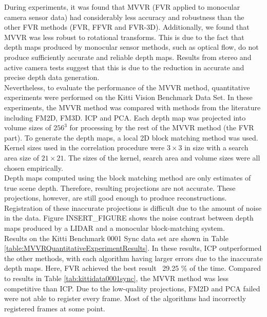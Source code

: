 
During experiments, it was found that MVVR (FVR applied to monocular camera sensor data) had considerably less accuracy and robustness than the other FVR methods (FVR, FFVR and FVR-3D). Additionally, we found that MVVR was less robust to rotational transforms. This is due to the fact that depth maps produced by monocular sensor methods, such as optical flow, do not produce sufficiently accurate and reliable depth maps. Results from stereo and active camera tests suggest that this is due to the reduction in accurate and precise depth data generation. \\

Nevertheless, to evaluate the performance of the MVVR method, quantitative experiments were performed on the Kitti Vision Benchmark Data Set. In these experiments, the MVVR method was compared with methods from the literature including FM2D, FM3D. ICP and PCA. Each depth map was projected into volume sizes of $256^3$ for processing by the rest of the MVVR method (the FVR part). To generate the depth maps, a local 2D block matching method was used. Kernel sizes used in the correlation procedure were $3 \times 3$ in size with a search area size of $21 \times 21$. The sizes of the kernel, search area and volume sizes were all chosen empirically. \\

Depth maps computed using the block matching method are only estimates of true scene depth. Therefore, resulting projections are not accurate. These projections, however, are still good enough to produce reconstructions. Registration of these inaccurate projections is difficult due to the amount of noise in the data. Figure INSERT_FIGURE shows the noise contrast between depth maps produced by a LIDAR and a monocular block-matching system. \\

Results on the Kitti Benchmark 0001 Sync data set are shown in Table \ref{table:MVVRQuantitativeExperimentResults}. In these results, ICP outperformed the other methods, with each algorithm having larger errors due to the inaccurate depth maps. Here, FVR achieved the best result ~29.25 \% of the time. Compared to results in Table \ref{tab:kittidata0001sync}, the MVVR method was less competitive than ICP. Due to the low-quality projections, FM2D and PCA failed were not able to register every frame. Most of the algorithms had incorrectly registered frames at some point.


